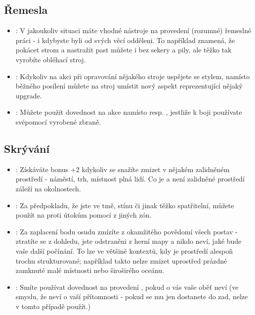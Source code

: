 \documentclass[../main.tex]{subfiles}
\begin{document}
\subsection{Řemesla}
\label{sec:trik-remesla}
\begin{itemize}
  
\item{}:
\label{sec:remesla-pripraven}
V jakoukoliv situaci máte vhodné nástroje na provedení (rozumné) řemeslné práci - i kdybyste byli od svých věcí odděleni. To například znamená, že pokácet strom a nastražit past můžete i bez sekery a pily, ale těžko tak vyrobíte obléhací stroj.

\item{}:
\label{sec:remesla-lepsi}
Kdykoliv na akci  při opravování nějakého stroje uspějete se stylem, namísto běžného posílení můžete na stroj umístit nový aspekt reprezentující nějaký upgrade.

\item {}:
\label{sec:remesla-zbrane}
 Můžete použít dovednost  na akce  namísto  resp. , jestliže k boji používate svépomocí vyrobené zbraně.

\end{itemize}



\subsection{Skrývání}
\label{sec:trik-skryvani}
\begin{itemize}
  
\item{}:
\label{sec:skryvani-tvar}
Získáváte bonus +2 kdykoliv se snažíte zmizet v nějakém zalidněném prostředí - náměstí, trh, místnost plná lidí. Co je a není zalidněné prostředí záleží na okolnostech.

\item{}:
\label{sec:skryvani-nejasny}
Za předpokladu, že jste ve tmě, stínu či jinak těžko spatřitelní, můžete použít  na  proti útokům pomocí  z jiných zón.

\item{}:
\label{sec:skryvani-zmizel}
  Za zaplacení bodu osudu zmízíte z okamžitého povědomí všech postav - ztratíte se z dohledu, jste odstraněni z herní mapy a nikdo neví, jaké bude vaše další počínání. To lze ve většině kontextů, kdy je prostředí alespoň trochu strukturované; například takto nelze zmizet uprostřed prázdné zamknuté malé místnosti nebo široširého oceánu.

\item{}:
\label{sec:skryvani-utok}
 Smíte používat dovednost  na provedení , pokud o vás vaše oběť neví (ve smyslu, že neví o vaší přítomnosti - pokud se mu jen dostanete do zad, nelze v tomto případě  použít.)
\end{itemize}
\end{document}
